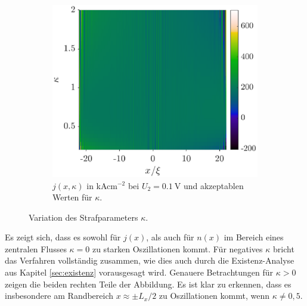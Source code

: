 \begin{figure}
\begin{subfigure}[b]{0.48\textwidth}
    \end{subfigure}
    \quad
    \begin{subfigure}[b]{0.48\textwidth}
        \centering
        \includegraphics[width=\textwidth]{plots/kappa/kappa_variation_0.1V_j.eps}
        \caption[]%
        {{\small $j(x,\kappa)$ in kAcm$^{-2}$ bei $U_2=\SI{0.1}{\volt}$ und akzeptablen Werten für $\kappa$.}}
        \label{fig:kappa_var_4}
    \end{subfigure}
    \caption[]
    {Variation des Strafparameters $\kappa$.}
    \label{fig:kappa_var}
\end{figure}
Es zeigt sich, dass es sowohl für $j(x)$, als auch für $n(x)$ im Bereich eines zentralen Flusses $\kappa=0$ zu starken Oszillationen kommt. Für negatives $\kappa$ bricht das Verfahren vollständig zusammen, wie dies auch durch die Existenz-Analyse aus Kapitel \ref{sec:existenz} vorausgesagt wird. Genauere Betrachtungen für $\kappa>0$ zeigen die beiden rechten Teile der Abbildung. Es ist klar zu erkennen, dass es insbesondere am Randbereich $x\approx \pm L_x/2$ zu Oszillationen kommt, wenn $\kappa\neq 0,5$.



